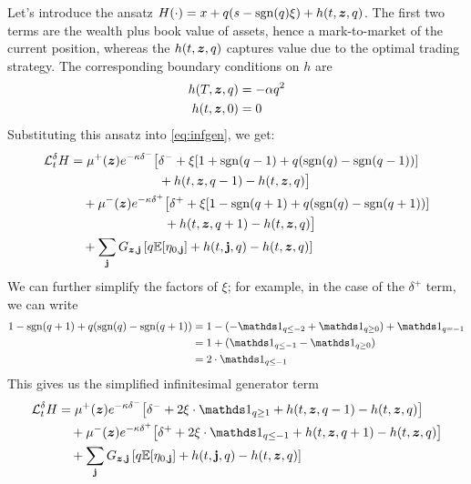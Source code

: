 Let's introduce the ansatz $H(\cdot) = x + q(s - \mathrm{sgn}(q)\xi) + h(t,\bm{z},q)$. The first two terms are the wealth plus book value of assets, hence a mark-to-market of the current position, whereas the $h(t,\bm{z},q)$ captures value due to the optimal trading strategy. The corresponding boundary conditions on $h$ are
\begin{align}
h(T, \bm{z}, q) & = - \alpha q^2 \\
h(t, \bm{z}, 0) & = 0
\end{align}
Substituting this ansatz into \autoref{eq:infgen}, we get:
\begin{equation}
\begin{split}
\cL^{\delta}_t H & = \mu^+(\bz) e^{ -\kappa \delta^{-}} \bigl[ \delta^- + \xi [ 1 + \mathrm{sgn}(q-1) + q(\mathrm{sgn}(q) - \mathrm{sgn}(q-1) ) ] \\
& \hphantom{ {}={} \mu^+(\bz) e^{ -\kappa \delta^{-}} \bigl[ } + h(t,\bz,q-1) - h(t,\bz,q) \bigr] \\
& \quad + \mu^-(\bz) e^{ -\kappa \delta^{+}} \bigl[ \delta^+ + \xi [ 1 - \mathrm{sgn}(q+1) + q(\mathrm{sgn}(q) - \mathrm{sgn}(q+1) ) ] \\
& \hphantom{\quad + \mu^-(\bz) e^{ -\kappa \delta^{+}} \bigl[} + h(t,\bz,q+1) - h(t,\bz,q) \bigr] \\
& \quad + \sum_{\bj} G_{\bz,\bj} \left[q \E [\eta_{0,\bj}] +h(t,\bj,q) - h(t,\bz, q) \right]
\end{split}
\end{equation}
We can further simplify the factors of $\xi$; for example, in the case of the $\delta^+$ term, we can write
\begin{align*}
1 - \mathrm{sgn}(q+1) + q(\mathrm{sgn}(q) - \mathrm{sgn}(q+1) )  & = 
1 - (- \indicator_{q \leq -2} + \indicator_{q \geq 0}) +  \indicator_{q = -1} \\
& = 1 + ( \indicator_{q \leq -1} -  \indicator_{q \geq 0} )\\
& = 2 \cdot \indicator_{q \leq -1}
\end{align*}
This gives us the simplified infinitesimal generator term
\begin{equation}
\begin{split}
\cL^{\delta}_t H & = \mu^+(\bz) e^{ -\kappa \delta^{-}} \bigl[ \delta^- + 2 \xi \cdot \indicator_{q \geq 1} + h(t,\bz,q-1) - h(t,\bz,q) \bigr] \\
& \quad + \mu^-(\bz) e^{ -\kappa \delta^{+}} \bigl[ \delta^+ + 2 \xi \cdot \indicator_{q \leq -1} + h(t,\bz,q+1) - h(t,\bz,q) \bigr] \\
& \quad + \sum_{\bj} G_{\bz,\bj} \left[q \E [\eta_{0,\bj}] +h(t,\bj,q) - h(t,\bz, q) \right]
\end{split}
\end{equation}
